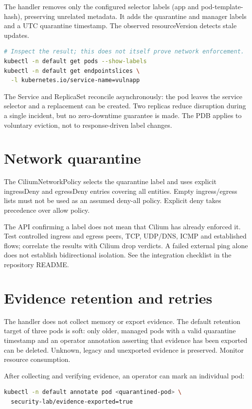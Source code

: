 The handler removes only the configured selector labels (app and pod-template-hash),
preserving unrelated metadata. It adds the quarantine and manager labels and a UTC
quarantine timestamp. The observed resourceVersion detects stale updates.

\begin{lstlisting}[language=bash]
# Inspect the result; this does not itself prove network enforcement.
kubectl -n default get pods --show-labels
kubectl -n default get endpointslices \
  -l kubernetes.io/service-name=vulnapp
\end{lstlisting}

The Service and ReplicaSet reconcile asynchronously: the pod leaves the service
selector and a replacement can be created. Two replicas reduce disruption during
a single incident, but no zero-downtime guarantee is made. The PDB applies to voluntary
eviction, not to response-driven label changes.

\section{Network quarantine}

The CiliumNetworkPolicy selects the quarantine label and uses explicit ingressDeny
and egressDeny entries covering all entities. Empty ingress/egress lists must not be
used as an assumed deny-all policy. Explicit deny takes precedence over allow policy.

The API confirming a label does not mean that Cilium has already enforced it. Test
controlled ingress and egress peers, TCP, UDP/DNS, ICMP and established flows; correlate
the results with Cilium drop verdicts. A failed external ping alone does not establish
bidirectional isolation. See the integration checklist in the repository README.

\section{Evidence retention and retries}

The handler does not collect memory or export evidence. The default retention target
of three pods is soft: only older, managed pods with a valid quarantine timestamp and
an operator annotation asserting that evidence has been exported can be deleted.
Unknown, legacy and unexported evidence is preserved. Monitor resource consumption.

After collecting and verifying evidence, an operator can mark an individual pod:
\begin{lstlisting}[language=bash]
kubectl -n default annotate pod <quarantined-pod> \
  security-lab/evidence-exported=true
\end{lstlisting}


